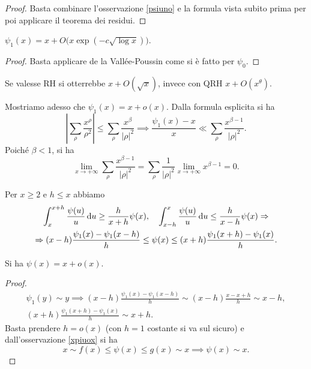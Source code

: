 \begin{proof}
  Basta combinare l'osservazione \ref{psiuno} e la formula vista subito prima per poi applicare il teorema dei residui.
\end{proof}

\begin{cor}
  $\psi_1(x)=x+O\big(x\exp(-c\sqrt{\log{x}})\big)$.
\end{cor}

\begin{proof}
  Basta applicare de la Vallée-Poussin come si è fatto per $\psi_0$.
\end{proof}

Se valesse RH si otterrebbe $x+O(\sqrt{x})$, invece con QRH $x+O(x^{\theta})$.

Mostriamo adesso che $\psi_1(x)=x+o(x)$. Dalla formula esplicita si ha
$$\left|\sum_{\rho} \frac{x^{\rho}}{\rho^2}\right| \le \sum_{\rho} \frac{x^{\beta}}{|\rho|^2} \implies \frac{\psi_1(x)-x}{x} \ll \sum_{\rho} \frac{x^{\beta-1}}{|\rho|^2}.$$
Poiché $\beta<1$, si ha
$$\lim_{x \longrightarrow +\infty} \sum_{\rho} \frac{x^{\beta-1}}{|\rho|^2}=\sum_{\rho} \frac{1}{|\rho|^2} \lim_{x \longrightarrow +\infty} x^{\beta-1}=0.$$

\begin{oss} \label{xpiuox}
  Per $x \ge 2$ e $h \le x$ abbiamo
  \begin{gather*}
    \int_x^{x+h} \frac{\psi(u)}{u}\mathop{}\!\mathrm{d} u \ge \frac{h}{x+h}\psi(x), \quad \int_{x-h}^x \frac{\psi(u)}{u}\mathop{}\!\mathrm{d} u \le \frac{h}{x-h}\psi(x) \Rightarrow \\
    \Rightarrow (x-h)\frac{\psi_1(x)-\psi_1(x-h)}{h} \le \psi(x) \le (x+h)\frac{\psi_1(x+h)-\psi_1(x)}{h}.
  \end{gather*}
\end{oss}

\begin{prop}
  Si ha $\psi(x)=x+o(x)$.
\end{prop}

\begin{proof}
  \begin{gather*}
    \psi_1(y) \sim y \implies (x-h)\frac{\psi_1(x)-\psi_1(x-h)}{h} \sim (x-h)\frac{x-x+h}{h}\sim x-h, \\
    (x+h)\frac{\psi_1(x+h)-\psi_1(x)}{h} \sim x+h.
  \end{gather*}
  Basta prendere $h=o(x)$ (con $h=1$ costante si va sul sicuro) e dall'osservazione \ref{xpiuox} si ha
  $$x \sim f(x) \le \psi(x) \le g(x) \sim x \implies \psi(x) \sim x.$$
\end{proof}
